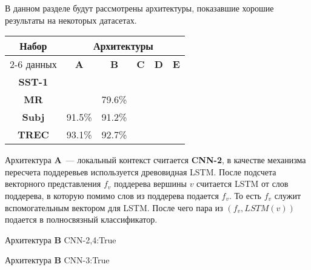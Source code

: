 В данном разделе будут рассмотрены архитектуры, показавшие хорошие результаты на некоторых датасетах.

\vspace{5mm}
\noindent \begin{minipage}{\linewidth}
 \label{tab:title} 
\begin{tabular}{|c|c|c|c|c|c|}
\hline
\multirow{2}{*}{Набор}   &             \multicolumn{5}{c|}{Архитектуры} \\ \cline{2-6} 
     данных              &  \textbf{A}  & \textbf{B} & \textbf{C} & \textbf{D} & \textbf{E} \\ \hline
\textbf{SST-1}           &              &            &            &            &            \\ \hline
\textbf{MR}              &              & 79.6\%     &            &            &            \\ \hline
\textbf{Subj}            & 91.5\%       & 91.2\%     &            &            &            \\ \hline
\textbf{TREC}            & 93.1\%       & 92.7\%     &            &            &            \\ \hline
\end{tabular}
\end{minipage}
\vspace{5mm}

Архитектура \textbf{A}~--- локальный контекст считается \textbf{CNN-2}, в качестве механизма пересчета поддеревьев используется древовидная LSTM. После подсчета векторного представления $f_v$ поддерева вершины $v$ считается LSTM от слов поддерева, в которую помимо слов из поддерева подается $f_v$. То есть $f_v$ служит вспомогательным вектором для
LSTM. После чего пара из $(f_v, LSTM(v))$ подается в полносвязный классификатор.

Архитектура \textbf{B} CNN-2,4:True

Архитектура \textbf{B} CNN-3:True